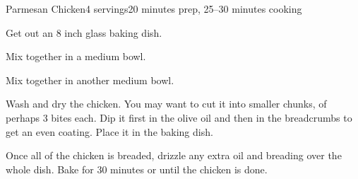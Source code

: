 \documentclass[../Cookbook.tex]{subfiles}
\begin{document}
\begin{recipe}{Parmesan Chicken}{4 servings}{20 minutes prep, 25--30 minutes cooking}

 Get out an 8 inch glass baking dish.

Mix together in a medium bowl.

Mix together in another medium bowl.

Wash and dry the chicken. You may want to cut it into smaller chunks, of perhaps 3 bites each. Dip it first in the olive oil and then in the breadcrumbs to get an even coating. Place it in the baking dish.

\newstep
Once all of the chicken is breaded, drizzle any extra oil and breading over the whole dish.
Bake for 30 minutes or until the chicken is done.


\end{recipe}
\end{document}
